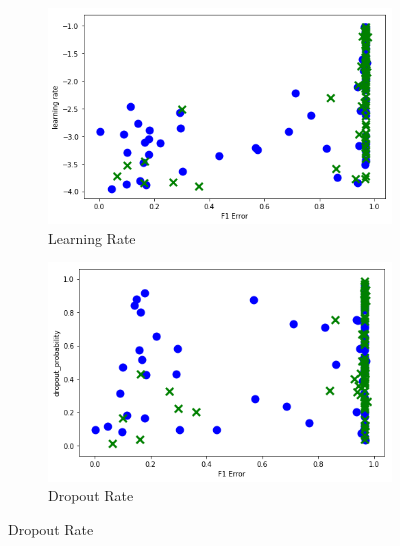 \begin{figure}[H]
     \centering
     \begin{subfigure}[b]{0.49\textwidth}
         \centering
         \includegraphics[width=\textwidth]{images/learning_rate_dummy.png}
         \caption{Learning Rate}
         \label{fig:learning_rate_learning}
     \end{subfigure}
     \hfill
     \begin{subfigure}[b]{0.49\textwidth}
         \centering
         \includegraphics[width=\textwidth]{images/dropout_dummy.png}
         \caption{Dropout Rate}
         \label{fig:dropout_learning}
     \end{subfigure}


\end{figure}
